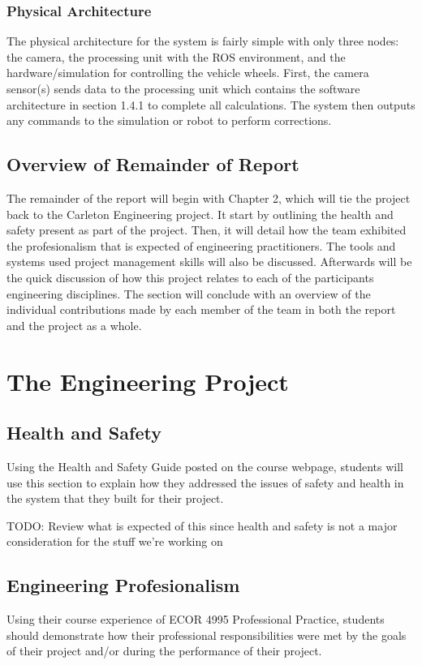 \documentclass[titlepage]{article}
\begin{document}
\subsubsection{Physical Architecture}

The physical architecture for the system is fairly simple with only three nodes: the camera, the processing unit with the ROS environment, and the hardware/simulation for controlling the vehicle wheels. First, the camera sensor(s) sends data to the processing unit which contains the software architecture in section 1.4.1 to complete all calculations. The system then outputs any commands to the simulation or robot to perform corrections. 

\subsection{Overview of Remainder of Report}

The remainder of the report will begin with Chapter 2, which will tie the project back to the Carleton Engineering project. It start by outlining the health and safety present as part of the project.  Then, it will detail how the team exhibited the profesionalism that is expected of engineering practitioners. The tools and systems used project management skills will also be discussed. Afterwards will be the quick discussion of how this project relates to each of the participants engineering disciplines. The section will conclude with an overview of the individual contributions made by each member of the team in both the report and the project as a whole. 

\section{The Engineering Project}

\subsection{Health and Safety}
Using the Health and Safety Guide posted on the course webpage, students will use this section to explain how they addressed the issues of safety and health in the system that they built for their project.

TODO: Review what is expected of this since health and safety is not a major consideration for the stuff we're working on

\subsection{Engineering Profesionalism}
Using their course experience of ECOR 4995 Professional Practice,
students should demonstrate how their professional responsibilities
were met by the goals of their project and/or during the
performance of their project.
\end{document}
